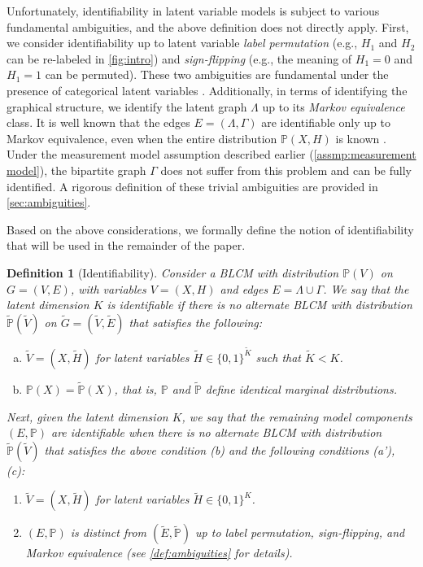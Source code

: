 \documentclass[10pt]{article} %
\newtheorem{definition}{Definition}
\newcommand{\PP}{\mathbb P}
\def\tilde{\widetilde}
\begin{document}
%
Unfortunately, identifiability in latent variable models is subject to various fundamental ambiguities, and the above definition does not directly apply.
%
First, we consider identifiability up to latent variable \emph{label permutation} (e.g., $H_1$ and $H_2$ can be re-labeled in \cref{fig:intro}) and \emph{sign-flipping} (e.g., the meaning of $H_1 = 0$ and $H_1 = 1$ can be permuted). These two ambiguities are fundamental under the presence of categorical latent variables \citep{lee2025deep}. 
%
%
Additionally, in terms of identifying the graphical structure, we identify the latent graph $\Lambda$ up to its \emph{Markov equivalence} class. It is well known that the edges $E = (\Lambda, \Gamma)$ are identifiable only up to Markov equivalence, even when the entire distribution $\PP(X, H)$ is known \citep{pearl2014probabilistic, spirtes2001causation}. Under the measurement model assumption described earlier (\cref{assmp:measurement model}), the bipartite graph $\Gamma$ does not suffer from this problem and can be fully identified. {A rigorous definition of these trivial ambiguities are provided in \cref{sec:ambiguities}.}
%
%
%
%
%

Based on the above considerations, we formally define the notion of identifiability that will be used in the remainder of the paper.
\begin{definition}[Identifiability]\label{def:identifiability}
    Consider a BLCM with distribution $\PP(V)$ on $G = (V, E)$, with variables $V = (X, H)$ and edges $E = \Lambda \cup \Gamma$. 
    We say that the \emph{latent dimension} $K$ is identifiable if there is no alternate BLCM with distribution $\tilde{\PP}(\tilde{V})$ on $\tilde{G} = (\tilde{V}, \tilde{E})$ that satisfies the following:
    \begin{enumerate}[(a)]
        \item $\tilde{V} = (X, \tilde{H})$ for latent variables $\tilde{H} \in \{0,1\}^{\tilde{K}}$ such that $\tilde{K} < K$.
        \item $\PP(X) = \tilde{\PP}(X)$, that is, $\PP$ and $\tilde{\PP}$ define identical marginal distributions.
    \end{enumerate}
    Next, given the latent dimension $K$, we say that the remaining \emph{model components} $(E, \PP)$ are identifiable when there is no alternate BLCM with distribution $\tilde{\PP}(\tilde{V})$ that satisfies the above condition (b) and the following conditions (a'), (c):
    \begin{enumerate}
        \item[(a')] $\tilde{V} = (X, \tilde{H})$ for latent variables $\tilde{H} \in \{0,1\}^{K}$.
        \item[(c)] $(E, \PP)$ is distinct from $(\tilde{E}, \tilde{\PP})$ up to label permutation, sign-flipping, and Markov equivalence (see \cref{def:ambiguities} for details).
    \end{enumerate}
\end{definition}
\end{document}
